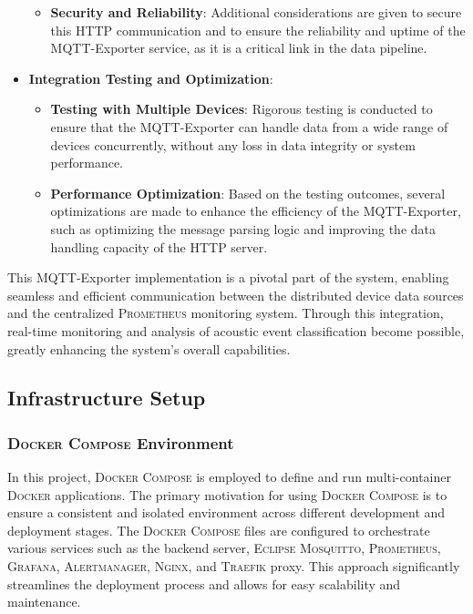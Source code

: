 \begin{itemize}
\begin{itemize}
          \item \textbf{Security and Reliability}: Additional considerations are given to secure this HTTP communication and to ensure the reliability and uptime of the MQTT-Exporter service, as it is a critical link in the data pipeline.
        \end{itemize}
  \item \textbf{Integration Testing and Optimization}: \begin{itemize}
          \item \textbf{Testing with Multiple Devices}: Rigorous testing is conducted to ensure that the MQTT-Exporter can handle data from a wide range of devices concurrently, without any loss in data integrity or system performance.
          \item \textbf{Performance Optimization}: Based on the testing outcomes, several optimizations are made to enhance the efficiency of the MQTT-Exporter, such as optimizing the message parsing logic and improving the data handling capacity of the HTTP server.
        \end{itemize}
\end{itemize}

This MQTT-Exporter implementation is a pivotal part of the system, enabling seamless and efficient communication between the distributed device data sources and the centralized \textsc{Prometheus} monitoring system. Through this integration, real-time monitoring and analysis of acoustic event classification become possible, greatly enhancing the system's overall capabilities.

\subsection{Infrastructure Setup}
\subsubsection{\textsc{Docker Compose} Environment}
In this project, \textsc{Docker Compose} is employed to define and run multi-container \textsc{Docker} applications. The primary motivation for using \textsc{Docker Compose} is to ensure a consistent and isolated environment across different development and deployment stages. The \textsc{Docker Compose} files are configured to orchestrate various services such as the backend server, \textsc{Eclipse Mosquitto}, \textsc{Prometheus}, \textsc{Grafana}, \textsc{Alertmanager}, \textsc{Nginx}, and \textsc{Traefik} proxy. This approach significantly streamlines the deployment process and allows for easy scalability and maintenance.

